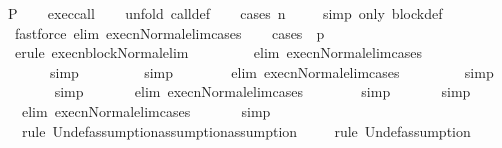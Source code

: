 \begin{isabellebody}
\ {\isachardoublequoteopen}P{\isachardoublequoteclose}\isanewline
%
\isadelimproof
\ \ %
\endisadelimproof
%
\isatagproof
{}\isamarkupfalse%
\ exec{\isacharunderscore}call\isanewline
\ \ \isamarkupfalse%
\ {\isacharparenleft}unfold\ call{\isacharunderscore}def{\isacharparenright}\isanewline
\ \ \isamarkupfalse%
\ {\isacharparenleft}cases\ n{\isacharparenright}\isanewline
\ \ \isamarkupfalse%
\ \ {\isacharparenleft}simp\ only{\isacharcolon}\ block{\isacharunderscore}def{\isacharparenright}\isanewline
\ \ \isamarkupfalse%
\ \ {\isacharparenleft}fastforce\ elim{\isacharcolon}\ execn{\isacharunderscore}Normal{\isacharunderscore}elim{\isacharunderscore}cases{\isacharparenright}\isanewline
\ \ \isamarkupfalse%
\ {\isacharparenleft}cases\ {\isachardoublequoteopen}{\isasymGamma}\ p{\isachardoublequoteclose}{\isacharparenright}\isanewline
\ \ \isamarkupfalse%
\ \ {\isacharparenleft}erule\ execn{\isacharunderscore}block{\isacharunderscore}Normal{\isacharunderscore}elim{\isacharparenright}\isanewline
\ \ \isamarkupfalse%
\ \ \ \ \ \ {\isacharparenleft}elim\ execn{\isacharunderscore}Normal{\isacharunderscore}elim{\isacharunderscore}cases{\isacharparenright}\isanewline
\ \ \isamarkupfalse%
\ \ \ \ \ \ \ simp\isanewline
\ \ \isamarkupfalse%
\ \ \ \ \ \ simp\isanewline
\ \ \isamarkupfalse%
\ \ \ \ \ {\isacharparenleft}elim\ execn{\isacharunderscore}Normal{\isacharunderscore}elim{\isacharunderscore}cases{\isacharparenright}\isanewline
\ \ \isamarkupfalse%
\ \ \ \ \ \ simp\isanewline
\ \ \isamarkupfalse%
\ \ \ \ \ simp\isanewline
\ \ \isamarkupfalse%
\ \ \ \ {\isacharparenleft}elim\ execn{\isacharunderscore}Normal{\isacharunderscore}elim{\isacharunderscore}cases{\isacharparenright}\isanewline
\ \ \isamarkupfalse%
\ \ \ \ \ simp\isanewline
\ \ \isamarkupfalse%
\ \ \ \ simp\isanewline
\ \ \isamarkupfalse%
\ \ \ {\isacharparenleft}elim\ execn{\isacharunderscore}Normal{\isacharunderscore}elim{\isacharunderscore}cases{\isacharparenright}\isanewline
\ \ \isamarkupfalse%
\ \ \ \ simp\isanewline
\ \ \isamarkupfalse%
\ \ \ {\isacharparenleft}rule\ Undef{\isacharcomma}assumption{\isacharcomma}assumption{\isacharcomma}assumption{\isacharparenright}\isanewline
\ \ \isamarkupfalse%
\ \ {\isacharparenleft}rule\ Undef{\isacharcomma}assumption{\isacharplus}{\isacharparenright}\isanewline

\end{isabellebody}
